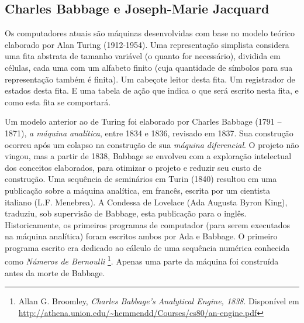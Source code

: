 \begin{citacao}
\end{citacao}

\subsection{Charles Babbage e Joseph-Marie Jacquard}

Os computadores atuais são máquinas desenvolvidas com base no modelo teórico elaborado por Alan Turing (1912-1954). Uma representação simplista considera uma fita abstrata de tamanho variável (o quanto for necessário), dividida em células, cada uma com um alfabeto finito (cuja quantidade de símbolos para sua representação também é finita). Um cabeçote leitor desta fita. Um registrador de estados desta fita. E uma tabela de ação que indica o que será escrito nesta fita, e como esta fita se comportará.%


 Um modelo anterior ao de Turing foi elaborado por Charles Babbage (1791 -- 1871), \emph{a máquina analítica},  entre 1834 e 1836, revisado em 1837. Sua construção ocorreu após um colapso na construção de sua \emph{máquina diferencial}. O projeto não vingou, mas a partir de 1838, Babbage se envolveu com a exploração intelectual dos conceitos elaborados, para otimizar o projeto e reduzir seu custo de construção. Uma sequência de seminários em Turin (1840) resultou em uma publicação sobre a máquina analítica, em francês, escrita por um cientista italiano (L.F. Menebrea). A Condessa de Lovelace (Ada Augusta Byron King), traduziu, sob supervisão de Babbage, esta publicação para o inglês. Historicamente, os primeiros programas de computador (para serem executados na máquina analítica) foram escritos ambos por Ada e Babbage. O primeiro programa escrito era dedicado ao cálculo de uma sequência numérica conhecida como \emph{Números de Bernoulli} \footnote{Allan G. Broomley, \emph{Charles Babbage’s Analytical Engine, 1838}. Disponível em \url{http://athena.union.edu/~hemmendd/Courses/cs80/an-engine.pdf}}. Apenas uma parte da máquina foi construída antes da morte de Babbage.

